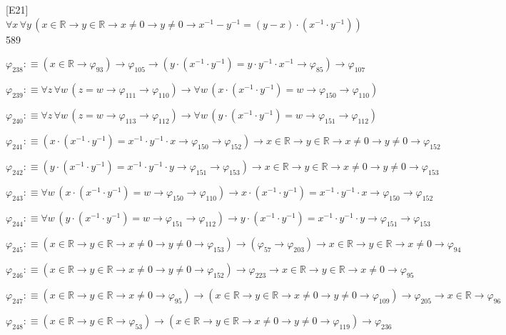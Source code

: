 \begin{fullproof}{[E21]}{$\forall x\,\forall y\,(x \in \mathbb{R} \to y \in \mathbb{R} \to x \neq 0 \to y \neq 0 \to x^{-1} - y^{-1} = (y - x) \cdot (x^{-1} \cdot y^{-1}))$}{589}
\begin{abbrevlist}
\item $\varphi_{238} :\equiv (x \in \mathbb{R} \to \varphi_{93}) \to \varphi_{105} \to (y \cdot (x^{-1} \cdot y^{-1}) = y \cdot y^{-1} \cdot x^{-1} \to \varphi_{85}) \to \varphi_{107}$
\item $\varphi_{239} :\equiv \forall z\,\forall w\,(z = w \to \varphi_{111} \to \varphi_{110}) \to \forall w\,(x \cdot (x^{-1} \cdot y^{-1}) = w \to \varphi_{150} \to \varphi_{110})$
\item $\varphi_{240} :\equiv \forall z\,\forall w\,(z = w \to \varphi_{113} \to \varphi_{112}) \to \forall w\,(y \cdot (x^{-1} \cdot y^{-1}) = w \to \varphi_{151} \to \varphi_{112})$
\item $\varphi_{241} :\equiv (x \cdot (x^{-1} \cdot y^{-1}) = x^{-1} \cdot y^{-1} \cdot x \to \varphi_{150} \to \varphi_{152}) \to x \in \mathbb{R} \to y \in \mathbb{R} \to x \neq 0 \to y \neq 0 \to \varphi_{152}$
\item $\varphi_{242} :\equiv (y \cdot (x^{-1} \cdot y^{-1}) = x^{-1} \cdot y^{-1} \cdot y \to \varphi_{151} \to \varphi_{153}) \to x \in \mathbb{R} \to y \in \mathbb{R} \to x \neq 0 \to y \neq 0 \to \varphi_{153}$
\item $\varphi_{243} :\equiv \forall w\,(x \cdot (x^{-1} \cdot y^{-1}) = w \to \varphi_{150} \to \varphi_{110}) \to x \cdot (x^{-1} \cdot y^{-1}) = x^{-1} \cdot y^{-1} \cdot x \to \varphi_{150} \to \varphi_{152}$
\item $\varphi_{244} :\equiv \forall w\,(y \cdot (x^{-1} \cdot y^{-1}) = w \to \varphi_{151} \to \varphi_{112}) \to y \cdot (x^{-1} \cdot y^{-1}) = x^{-1} \cdot y^{-1} \cdot y \to \varphi_{151} \to \varphi_{153}$
\item $\varphi_{245} :\equiv (x \in \mathbb{R} \to y \in \mathbb{R} \to x \neq 0 \to y \neq 0 \to \varphi_{153}) \to (\varphi_{57} \to \varphi_{203}) \to x \in \mathbb{R} \to y \in \mathbb{R} \to x \neq 0 \to \varphi_{94}$
\item $\varphi_{246} :\equiv (x \in \mathbb{R} \to y \in \mathbb{R} \to x \neq 0 \to y \neq 0 \to \varphi_{152}) \to \varphi_{223} \to x \in \mathbb{R} \to y \in \mathbb{R} \to x \neq 0 \to \varphi_{95}$
\item $\varphi_{247} :\equiv (x \in \mathbb{R} \to y \in \mathbb{R} \to x \neq 0 \to \varphi_{95}) \to (x \in \mathbb{R} \to y \in \mathbb{R} \to x \neq 0 \to y \neq 0 \to \varphi_{109}) \to \varphi_{205} \to x \in \mathbb{R} \to \varphi_{96}$
\item $\varphi_{248} :\equiv (x \in \mathbb{R} \to y \in \mathbb{R} \to \varphi_{53}) \to (x \in \mathbb{R} \to y \in \mathbb{R} \to x \neq 0 \to y \neq 0 \to \varphi_{119}) \to \varphi_{236}$
\end{abbrevlist}
\end{fullproof}
